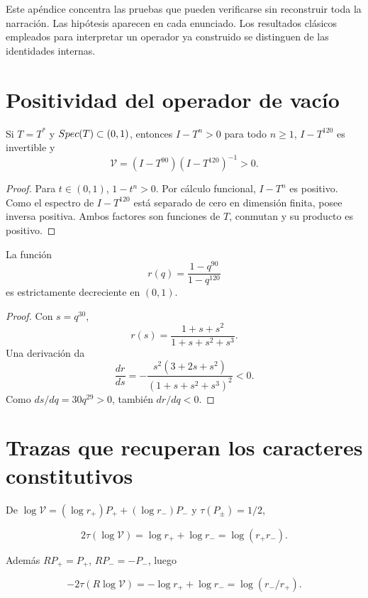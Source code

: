 \label{hmt:p3:app:proofs}

Este ap\'endice concentra las pruebas que pueden verificarse sin reconstruir toda la narraci\'on. Las hip\'otesis aparecen en cada enunciado. Los resultados cl\'asicos empleados para interpretar un operador ya construido se distinguen de las identidades internas.

\section{Positividad del operador de vac\'io}

\begin{lemma}
Si \(T=T^*\) y \(Spec(T)\subset(0,1)\), entonces \(I-T^n>0\) para todo \(n\ge1\), \(I-T^{120}\) es invertible y
\[
\mathcal V=(I-T^{90})(I-T^{120})^{-1}>0.
\]
\end{lemma}

\begin{proof}
Para \(t\in(0,1)\), \(1-t^n>0\). Por c\'alculo funcional, \(I-T^n\) es positivo. Como el espectro de \(I-T^{120}\) est\'a separado de cero en dimensi\'on finita, posee inversa positiva. Ambos factores son funciones de \(T\), conmutan y su producto es positivo.
\end{proof}

\begin{lemma}
La funci\'on
\[
r(q)=\frac{1-q^{90}}{1-q^{120}}
\]
es estrictamente decreciente en \((0,1)\).
\end{lemma}

\begin{proof}
Con \(s=q^{30}\),
\[
r(s)=\frac{1+s+s^2}{1+s+s^2+s^3}.
\]
Una derivaci\'on da
\[
\frac{dr}{ds}=
-\frac{s^2(3+2s+s^2)}{(1+s+s^2+s^3)^2}<0.
\]
Como \(ds/dq=30q^{29}>0\), tambi\'en \(dr/dq<0\).
\end{proof}

\section{Trazas que recuperan los caracteres constitutivos}

De \(\log\mathcal V=(\log r_+)P_++(\log r_-)P_-\) y \(\tau(P_\pm)=1/2\),

\[
2\tau(\log\mathcal V)=\log r_++\log r_-=\log(r_+r_-).
\]

Adem\'as \(RP_+=P_+\), \(RP_-=-P_-\), luego

\[
-2\tau(R\log\mathcal V)
=-\log r_++\log r_-
=\log(r_-/r_+).
\]

